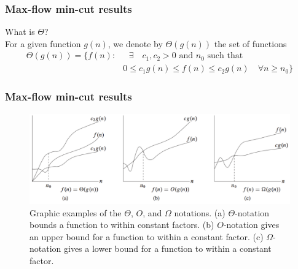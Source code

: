 \begin{frame}
\frametitle{Max-flow min-cut results}
What is $\Theta$?\\
For a given function $g(n)$, we denote by $\Theta (g(n))$ the set of functions
\begin{equation*}	
	\begin{split}
		\Theta(g(n)) = \{ f(n) : & \text{ $\exists \quad c_1, c_2 > 0$ and $n_0$ such that} \\
						 & 0 \le c_1 g(n) \le f(n) \le c_2 g(n) \quad \forall n \ge n_0 \}
	\end {split}
\end{equation*}
\end{frame}

\begin{frame}
\frametitle{Max-flow min-cut results}
	\begin{figure}
 		\centering
    		\includegraphics[width=\textwidth]{figs/4-Asymptotic_notation.png}
		\caption{Graphic examples of the $\Theta$, $O$, and $\Omega$  notations. (a) $\Theta$-notation bounds a function to within constant factors. (b) $O$-notation gives an upper bound for a function to within a constant factor. (c) $\Omega$-notation gives a lower bound for a function to within a constant factor.}
	\end{figure}
\end{frame}



